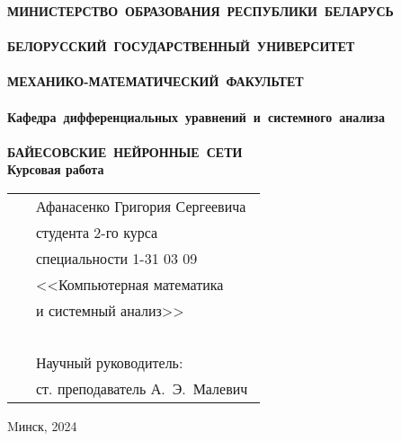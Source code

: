 \setcounter{page}{1}
\thispagestyle{empty}
\begin{center}
\bf
\vspace{4cm}
{
\mbox{МИНИСТЕРСТВО~ОБРАЗОВАНИЯ~РЕСПУБЛИКИ~БЕЛАРУСЬ} \\~\\
\mbox{БЕЛОРУССКИЙ~ГОСУДАРСТВЕННЫЙ~УНИВЕРСИТЕТ} \\~\\
\mbox{МЕХАНИКО-МАТЕМАТИЧЕСКИЙ~ФАКУЛЬТЕТ} \\~\\
\mbox{Кафедра~дифференциальных~уравнений~и~системного~анализа} \\~\\
}
\vspace{4cm}
\bf
\mbox{БАЙЕСОВСКИЕ НЕЙРОННЫЕ СЕТИ}\\
\vspace{1cm}
\rm Курсовая работа
\vspace{3cm}
\end{center}

\begin{tabular}{ll}
\hspace{10.5cm}
&Афанасенко Григория Сергеевича~\\
&студента 2-го курса\\
&специальности 1-31 03 09\\
&<<Компьютерная математика\\
&и системный анализ>>\\~\\
&Научный руководитель:\\
&ст. преподаватель А.~Э.~Малевич
\end{tabular}
\vspace{4cm}
\begin{center}
    Mинск, 2024
\end{center}
\clearpage
\restoregeometry
